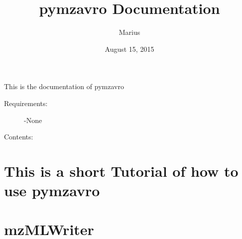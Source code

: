 \documentclass[letterpaper,10pt,english]{sphinxmanual}
\title{pymzavro Documentation}
\date{August 15, 2015}
\author{Marius}
\begin{document}
\maketitle
\tableofcontents
{}\label{index::doc}


This is the documentation of pymzavro
\begin{description}
\item[{Requirements:}] \leavevmode
-None

\end{description}

Contents:


\chapter{This is a short Tutorial of how to use pymzavro}
\label{tutorial:welcome-to-pymzavro-s-documentation}\label{tutorial:this-is-a-short-tutorial-of-how-to-use-pymzavro}\label{tutorial::doc}

\chapter{mzMLWriter}
\label{mzMLWriter:mzmlwriter}\label{mzMLWriter::doc}\label{mzMLWriter:module-mzMLWriter}
\end{document}
